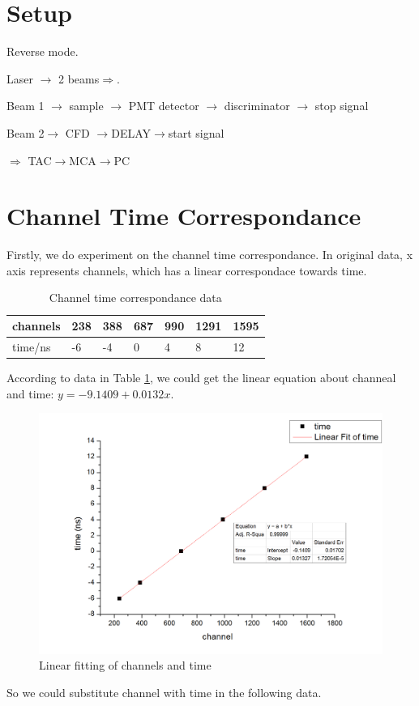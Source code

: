 \documentclass{article}
\begin{document}
\section{Setup} 
Reverse mode.\par 
Laser $\longrightarrow$ 2 beams$\Rightarrow$.\par 
Beam 1 $\longrightarrow$ sample $\longrightarrow$ PMT detector $\longrightarrow$ discriminator $\longrightarrow$ stop signal\par 
Beam 2$\longrightarrow$ CFD $\longrightarrow$DELAY$\longrightarrow$start signal \par 
$\Rightarrow$ TAC$\longrightarrow$MCA$\longrightarrow$PC

\section{Channel Time Correspondance}

Firstly, we do experiment on the channel time correspondance. In original data, x axis represents channels, which has a linear correspondace towards time.\par 

\begin{table}
\centering
\caption{Channel time correspondance data}
\label{my-label}
\begin{tabular}{@{}lllllll@{}}
\toprule
channels & 238 & 388 & 687 & 990 & 1291 & 1595\\ \midrule
time/ns  & -6  & -4  & 0   &   4 & 8 & 12\\
\bottomrule
\end{tabular}
\end{table}
\par
According to data in Table \ref{my-label}, we could get the linear equation about channeal and time: $y=-9.1409+0.0132x$.\par 

\begin{figure}
\begin{center}
\includegraphics[width=15cm]{Graph1}
\caption{Linear fitting of channels and time}
\label{channel-time}
\end{center}
\end{figure}
\par
So we could substitute channel with time in the following data.
\end{document}
